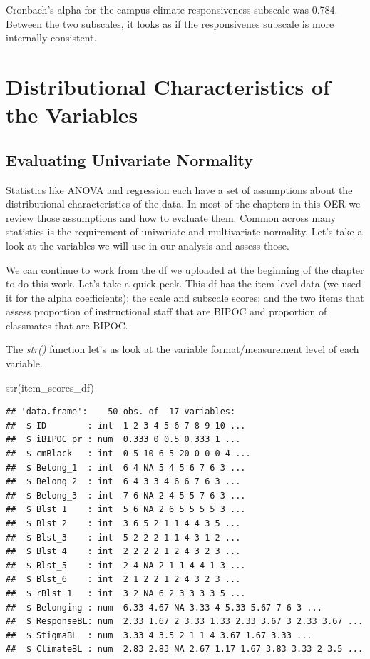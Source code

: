 \documentclass[
  11pt,
]{book}
\newenvironment{Shaded}{\begin{snugshade}}{\end{snugshade}}
\newcommand{\FunctionTok}[1]{\textcolor[rgb]{0.00,0.00,0.00}{#1}}
\newcommand{\NormalTok}[1]{#1}
\begin{document}
Cronbach's alpha for the campus climate responsiveness subscale was 0.784. Between the two subscales, it looks as if the responsivenes subscale is more internally consistent.

\hypertarget{distributional-characteristics-of-the-variables}{%
\section{Distributional Characteristics of the Variables}\label{distributional-characteristics-of-the-variables}}

\hypertarget{evaluating-univariate-normality}{%
\subsection{Evaluating Univariate Normality}\label{evaluating-univariate-normality}}

Statistics like ANOVA and regression each have a set of assumptions about the distributional characteristics of the data. In most of the chapters in this OER we review those assumptions and how to evaluate them. Common across many statistics is the requirement of univariate and multivariate normality. Let's take a look at the variables we will use in our analysis and assess those.

We can continue to work from the df we uploaded at the beginning of the chapter to do this work. Let's take a quick peek. This df has the item-level data (we used it for the alpha coefficients); the scale and subscale scores; and the two items that assess proportion of instructional staff that are BIPOC and proportion of classmates that are BIPOC.

The \emph{str()} function let's us look at the variable format/measurement level of each variable.

\begin{Shaded}
\begin{Highlighting}[]
\FunctionTok{str}\NormalTok{(item\_scores\_df)}
\end{Highlighting}
\end{Shaded}

\begin{verbatim}
## 'data.frame':    50 obs. of  17 variables:
##  $ ID        : int  1 2 3 4 5 6 7 8 9 10 ...
##  $ iBIPOC_pr : num  0.333 0 0.5 0.333 1 ...
##  $ cmBlack   : int  0 5 10 6 5 20 0 0 0 4 ...
##  $ Belong_1  : int  6 4 NA 5 4 5 6 7 6 3 ...
##  $ Belong_2  : int  6 4 3 3 4 6 6 7 6 3 ...
##  $ Belong_3  : int  7 6 NA 2 4 5 5 7 6 3 ...
##  $ Blst_1    : int  5 6 NA 2 6 5 5 5 5 3 ...
##  $ Blst_2    : int  3 6 5 2 1 1 4 4 3 5 ...
##  $ Blst_3    : int  5 2 2 2 1 1 4 3 1 2 ...
##  $ Blst_4    : int  2 2 2 2 1 2 4 3 2 3 ...
##  $ Blst_5    : int  2 4 NA 2 1 1 4 4 1 3 ...
##  $ Blst_6    : int  2 1 2 2 1 2 4 3 2 3 ...
##  $ rBlst_1   : int  3 2 NA 6 2 3 3 3 3 5 ...
##  $ Belonging : num  6.33 4.67 NA 3.33 4 5.33 5.67 7 6 3 ...
##  $ ResponseBL: num  2.33 1.67 2 3.33 1.33 2.33 3.67 3 2.33 3.67 ...
##  $ StigmaBL  : num  3.33 4 3.5 2 1 1 4 3.67 1.67 3.33 ...
##  $ ClimateBL : num  2.83 2.83 NA 2.67 1.17 1.67 3.83 3.33 2 3.5 ...
\end{verbatim}
\end{document}

